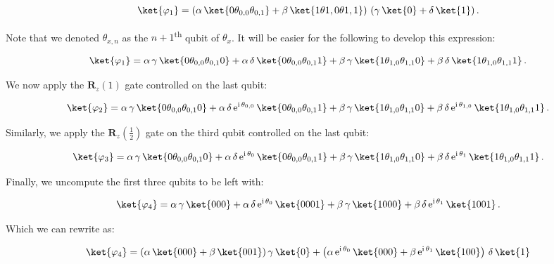 \documentclass[11pt, a4paper]{article}
\begin{document}
                \[\ket{\varphi_1} = \left(\alpha\,\ket{0\theta_{0,0}\theta_{0,1}} + \beta\,\ket{1\theta{1,0}\theta{1,1}}\right)\,(\gamma\,\ket{0} + \delta\,\ket{1})\,.\]
                
                Note that we denoted \(\theta_{x, n}\) as the \(n+1\)\textsuperscript{th} qubit of \(\theta_x\). It will be easier for the following to develop this expression:
                
                \[\ket{\varphi_1} = \alpha\,\gamma\,\ket{0\theta_{0,0}\theta_{0,1}0} + \alpha\,\delta\,\ket{0\theta_{0,0}\theta_{0,1}1} + \beta\,\gamma\,\ket{1\theta_{1,0}\theta_{1,1}0} + \beta\,\delta\,\ket{1\theta_{1,0}\theta_{1,1}1}\,.\]
                
                We now apply the \(\mathbf{R}_z(1)\) gate controlled on the last qubit:
                
                \[\ket{\varphi_2} = \alpha\,\gamma\,\ket{0\theta_{0,0}\theta_{0,1}0} + \alpha\,\delta\,\mathrm{e}^{\mathrm{i}\,\theta_{0,0}}\,\ket{0\theta_{0,0}\theta_{0,1}1} + \beta\,\gamma\,\ket{1\theta_{1,0}\theta_{1,1}0} + \beta\,\delta\,\mathrm{e}^{\mathrm{i}\,\theta_{1,0}}\,\ket{1\theta_{1,0}\theta_{1,1}1}\,.\]
                
                Similarly, we apply the \(\mathbf{R}_z\left(\frac12\right)\) gate on the third qubit controlled on the last qubit:
                
                \[\ket{\varphi_3} = \alpha\,\gamma\,\ket{0\theta_{0,0}\theta_{0,1}0} + \alpha\,\delta\,\mathrm{e}^{\mathrm{i}\,\theta_{0}}\,\ket{0\theta_{0,0}\theta_{0,1}1} + \beta\,\gamma\,\ket{1\theta_{1,0}\theta_{1,1}0} + \beta\,\delta\,\mathrm{e}^{\mathrm{i}\,\theta_{1}}\,\ket{1\theta_{1,0}\theta_{1,1}1}\,.\]
                
                Finally, we uncompute the first three qubits to be left with:
                
                \[\ket{\varphi_4} = \alpha\,\gamma\,\ket{000} + \alpha\,\delta\,\mathrm{e}^{\mathrm{i}\,\theta_{0}}\,\ket{0001} + \beta\,\gamma\,\ket{1000} + \beta\,\delta\,\mathrm{e}^{\mathrm{i}\,\theta_{1}}\,\ket{1001}\,.\]
                
                Which we can rewrite as:
                
                \[\ket{\varphi_4} = (\alpha\,\ket{000} + \beta\,\ket{001})\,\gamma\,\ket{0} + \left(\alpha\,\mathrm{e}^{\mathrm{i}\,\theta_0}\,\ket{000}+\beta\,\mathrm{e}^{\mathrm{i}\,\theta_1}\,\ket{100}\right)\,\delta\,\ket{1}\]
                
\end{document}
